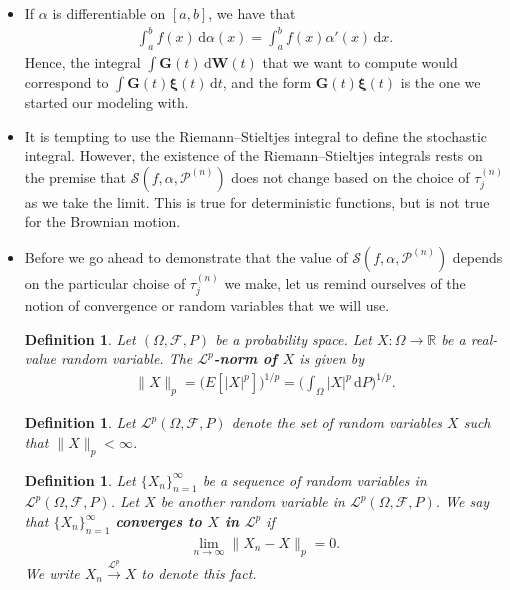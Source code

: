 \documentclass[10pt]{article}
\newtheorem{definition}[lemma]{Definition}
\newcommand{\dee}{\mathrm{d}}
\newcommand{\ve}[1]{\mathbf{#1}}
\newcommand{\ves}[1]{\boldsymbol{#1}}
\newcommand{\mcal}[1]{\mathcal{#1}}
\newcommand{\Real}{\mathbb{R}}
\begin{document}
\begin{itemize}
  \item If $\alpha$ is differentiable on $[a,b]$, we have that
  \begin{align*}
    \int_a^b f(x)\, \dee\alpha(x) = \int_a^b f(x)\alpha'(x)\, \dee x.
  \end{align*}
  Hence, the integral $\int \ve{G}(t)\, \dee\ve{W}(t)$ that we want to compute would correspond to $\int \ve{G}(t)\ves{\xi}(t) \, \dee t$, and the form $\ve{G}(t)\ves{\xi}(t)$ is the one we started our modeling with.

  \item It is tempting to use the Riemann--Stieltjes integral to define the stochastic integral. However, the existence of the Riemann--Stieltjes integrals rests on the premise that $\mcal{S}(f, \alpha, \mcal{P}^{(n)})$ does not change based on the choice of $\tau^{(n)}_j$ as we take the limit. This is true for deterministic functions, but is not true for the Brownian motion.

  \item Before we go ahead to demonstrate that the value of $\mcal{S}(f, \alpha, \mcal{P}^{(n)})$ depends on the particular choise of $\tau^{(n)}_j$ we make, let us remind ourselves of the notion of convergence or random variables that we will use.
  
  \begin{definition}
    Let $(\Omega, \mcal{F}, P)$ be a probability space. Let $X: \Omega \rightarrow \Real$ be a real-value random variable. The {\bf $\mcal{L}^p$-norm of $X$} is given by
    \begin{align*}
      \| X \|_p = \Big( E[ |X|^p ] \Big)^{1/p} = \bigg( \int_\Omega |X|^p\, \dee P \bigg)^{1/p}.
    \end{align*}    
  \end{definition}

  \begin{definition}
    Let $\mcal{L}^p(\Omega, \mcal{F}, P)$ denote the set of random variables $X$ such that $\| X \|_p < \infty$.    
  \end{definition}

  \begin{definition}
    Let $\{ X_n \}_{n=1}^\infty$ be a sequence of random variables in $\mcal{L}^p(\Omega, \mcal{F}, P)$. Let $X$ be another random variable in $\mcal{L}^p(\Omega, \mcal{F}, P)$. We say that $\{ X_n \}_{n=1}^\infty$ {\bf converges to $X$ in $\mcal{L}^p$} if
    \begin{align*}
      \lim_{n \rightarrow \infty} \| X_n - X \|_p = 0.
    \end{align*}
    We write $X_n \xrightarrow[]{\mcal{L}^p} X$ to denote this fact.
  \end{definition}
  

\end{itemize}
\end{document}
